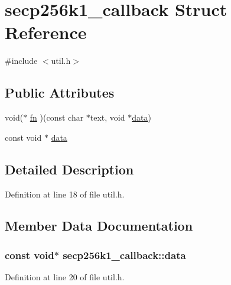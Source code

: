 \hypertarget{structsecp256k1__callback}{}\section{secp256k1\+\_\+callback Struct Reference}
\label{structsecp256k1__callback}


{\ttfamily \#include $<$util.\+h$>$}

\subsection*{Public Attributes}
\begin{DoxyCompactItemize}
\item 
void($\ast$ \hyperlink{structsecp256k1__callback_ab53dda8f586b668b302a0955de4de44c}{fn} )(const char $\ast$text, void $\ast$\hyperlink{structsecp256k1__callback_acd5a72114709ca9841ad31f88c1744bc}{data})
\item 
const void $\ast$ \hyperlink{structsecp256k1__callback_acd5a72114709ca9841ad31f88c1744bc}{data}
\end{DoxyCompactItemize}


\subsection{Detailed Description}


Definition at line 18 of file util.\+h.



\subsection{Member Data Documentation}
\hypertarget{structsecp256k1__callback_acd5a72114709ca9841ad31f88c1744bc}{}
\subsubsection[{data}]{\setlength{\rightskip}{0pt plus 5cm}const void$\ast$ secp256k1\+\_\+callback\+::data}\label{structsecp256k1__callback_acd5a72114709ca9841ad31f88c1744bc}


Definition at line 20 of file util.\+h.

\hypertarget{structsecp256k1__callback_ab53dda8f586b668b302a0955de4de44c}{}
